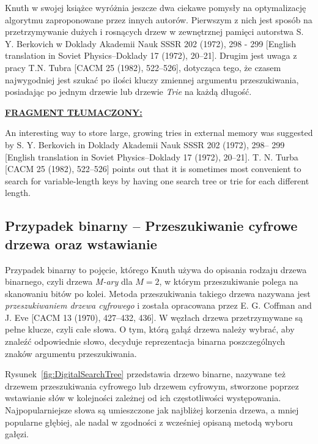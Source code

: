 	Knuth w swojej książce wyróżnia jeszcze dwa ciekawe pomysły na optymalizację algorytmu zaproponowane przez innych autorów. 
	Pierwszym z nich jest sposób na przetrzymywanie dużych i rosnących drzew w zewnętrznej pamięci autorstwa S. Y. Berkovich w Doklady Akademii Nauk SSSR 202 (1972), 298 - 299 [English translation in Soviet Physics–Doklady 17 (1972), 20–21]. 
	Drugim jest uwaga z pracy T.N. Tubra [CACM 25 (1982), 522–526], dotycząca tego, że czasem najwygodniej jest szukać po ilości kluczy zmiennej argumentu przeszukiwania, posiadając po jednym drzewie lub drzewie \emph{Trie} na każdą długość.
	
	\ifsourcematerial
	\begin{displayquote}
		\color{ao(english)}
		\underline{\textbf{FRAGMENT TŁUMACZONY:}} 
		
		An interesting way to store large, growing tries in external memory was
		suggested by S. Y. Berkovich in Doklady Akademii Nauk SSSR 202 (1972), 298–
		299 [English translation in Soviet Physics–Doklady 17 (1972), 20–21].
		T. N. Turba [CACM 25 (1982), 522–526] points out that it is sometimes
		most convenient to search for variable-length keys by having one search tree or
		trie for each different length.
	\end{displayquote}
	\fi
	
	\subsection{Przypadek binarny -- Przeszukiwanie cyfrowe drzewa oraz wstawianie}\label{sec:PrzypadekBinarnyPrzeszukiwanieCyfroweDrzewaOrazWstawianie}
	
	Przypadek binarny to pojęcie, którego Knuth używa do opisania rodzaju drzewa binarnego, czyli drzewa \emph{M-ary} dla $M=2$, w którym przeszukiwanie polega na skanowaniu bitów po kolei. Metoda przeszukiwania takiego drzewa nazywana jest \emph{przeszukiwaniem drzewa cyfrowego} i została opracowana przez E. G. Coffman	and J. Eve [CACM 13 (1970), 427–432, 436]. W węzłach drzewa przetrzymywane są pełne klucze, czyli całe słowa. O tym, którą gałąź drzewa należy wybrać, aby znaleźć odpowiednie słowo, decyduje reprezentacja binarna poszczególnych znaków argumentu przeszukiwania.\newline
	
	Rysunek~\ref{fig:DigitalSearchTree} przedstawia drzewo binarne, nazywane też drzewem przeszukiwania cyfrowego lub drzewem cyfrowym, stworzone poprzez wstawianie słów w kolejności zależnej od ich częstotliwości występowania. Najpopularniejsze słowa są umieszczone jak najbliżej korzenia drzewa, a mniej popularne głębiej, ale nadal w zgodności z wcześniej opisaną metodą wyboru gałęzi. \newline
	
